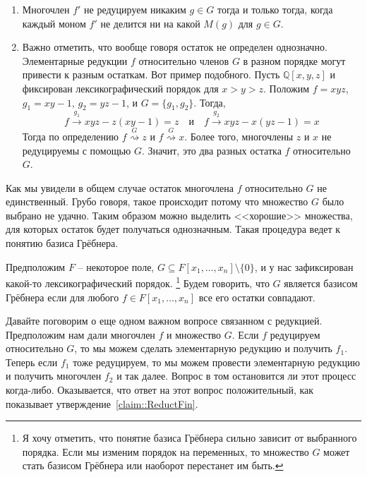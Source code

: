 \begin{remarks}
\begin{enumerate}
\item Многочлен $f'$ не редуцируем никаким $g\in G$ тогда и только тогда, когда каждый моном $f'$ не делится ни на какой $M(g)$ для $g\in G$.

\item Важно отметить, что вообще говоря остаток не определен однозначно.
Элементарные редукции $f$ относительно членов $G$ в разном порядке могут привести к разным остаткам.
Вот пример подобного.
Пусть $\mathbb Q[x, y, z]$ и фиксирован лексикографический порядок для $x > y > z$.
Положим $f = xyz$, $g_1 = xy - 1$, $g_2 = yz - 1$, и $G = \{g_1, g_2\}$.
Тогда,
\[
f\stackrel{g_1}{\longrightarrow}xyz - z(xy - 1) = z
\quad\text{и}\quad
f\stackrel{g_2}{\longrightarrow}xyz - x(yz - 1) = x
\]
Тогда по определению $f\stackrel{G}{\rightsquigarrow} z$ и $f\stackrel{G}{\rightsquigarrow} x$.
Более того, многочлены $z$ и $x$ не редуцируемы с помощью $G$.
Значит, это два разных остатка $f$ относительно $G$.
\end{enumerate}
\end{remarks}

Как мы увидели в общем случае остаток многочлена $f$ относительно $G$ не единственный.
Грубо говоря, такое происходит потому что множество $G$ было выбрано не удачно.
Таким образом можно выделить <<хорошие>> множества, для которых остаток будет получаться однозначным.
Такая процедура ведет к понятию базиса Грёбнера.

\begin{definition}
\label{def::GroebnerBasis}
Предположим $F$ -- некоторое поле, $G\subseteq F[x_1,\ldots,x_n]\setminus\{0\}$, и у нас зафиксирован какой-то лексикографический порядок.%
\footnote{Я хочу отметить, что понятие базиса Грёбнера сильно зависит от выбранного порядка.
Если мы изменим порядок на переменных, то множество $G$ может стать базисом Грёбнера или наоборот перестанет им быть.}
Будем говорить, что $G$ является базисом Грёбнера если для любого $f\in F[x_1,\ldots,x_n]$ все его остатки совпадают.
\end{definition}

Давайте поговорим о еще одном важном вопросе связанном с редукцией.
Предположим нам дали многочлен $f$ и множество $G$.
Если $f$ редуцируем относительно $G$, то мы можем сделать элементарную редукцию и получить $f_1$.
Теперь если $f_1$ тоже редуцируем, то мы можем провести элементарную редукцию и получить многочлен $f_2$ и так далее.
Вопрос в том остановится ли этот процесс когда-либо.
Оказывается, что ответ на этот вопрос положительный, как показывает утверждение~\ref{claim::ReductFin}.


